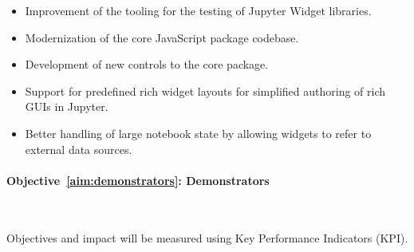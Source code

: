 \begin{itemize}
\item Improvement of the tooling for the testing of Jupyter Widget libraries.
\item Modernization of the core JavaScript package codebase.
\item Development of new controls to the core package.
\item Support for predefined rich widget layouts for simplified authoring of rich GUIs in Jupyter.
\item Better handling of large notebook state by allowing widgets to refer to external data sources.
\end{itemize}

\paragraph{Objective~\ref{aim:demonstrators}: Demonstrators}\

Objectives and impact will be measured using Key Performance
Indicators (KPI).

